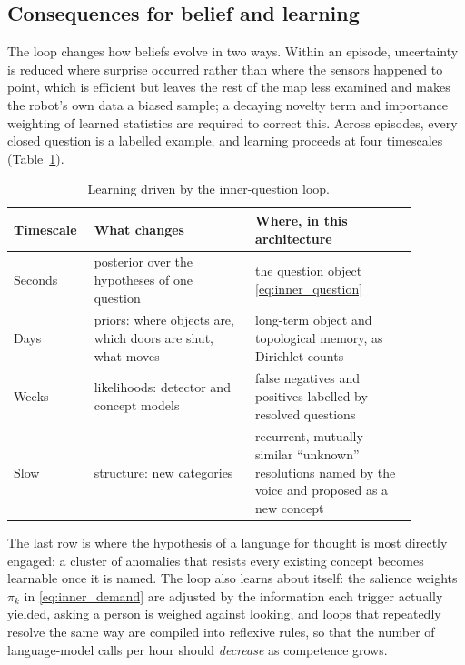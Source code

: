 \subsection{Consequences for belief and learning}
\label{sec:inner_speech:learning}

The loop changes how beliefs evolve in two ways. Within an episode, uncertainty is reduced where surprise
occurred rather than where the sensors happened to point, which is efficient but leaves the rest of the map less
examined and makes the robot's own data a biased sample; a decaying novelty term \cite{schwartenbeck2019curiosity}
and importance weighting of learned statistics are required to correct this. Across episodes, every closed
question is a labelled example, and learning proceeds at four timescales (Table~\ref{tab:inner_learning}).

\begin{table}[ht]
    \centering
    \small
    \begin{tabular}{|>{\raggedright\arraybackslash}p{0.14\linewidth}|>{\raggedright\arraybackslash}p{0.37\linewidth}|>{\raggedright\arraybackslash}p{0.37\linewidth}|}
        \hline
        \textbf{Timescale} & \textbf{What changes} & \textbf{Where, in this architecture} \\ \hline
        Seconds   & posterior over the hypotheses of one question         & the question object \eqref{eq:inner_question} \\ \hline
        Days      & priors: where objects are, which doors are shut, what moves & long-term object and topological memory, as Dirichlet counts \\ \hline
        Weeks     & likelihoods: detector and concept models              & false negatives and positives labelled by resolved questions \\ \hline
        Slow      & structure: new categories                             & recurrent, mutually similar ``unknown'' resolutions named by the voice and proposed as a new concept \\ \hline
    \end{tabular}
    \caption{Learning driven by the inner-question loop.}
    \label{tab:inner_learning}
\end{table}

The last row is where the hypothesis of a language for thought is most directly engaged: a cluster of anomalies
that resists every existing concept becomes learnable once it is named. The loop also learns about itself: the
salience weights $\pi_k$ in \eqref{eq:inner_demand} are adjusted by the information each trigger actually yielded,
asking a person is weighed against looking, and loops that repeatedly resolve the same way are compiled into
reflexive rules, so that the number of language-model calls per hour should \emph{decrease} as competence grows.


